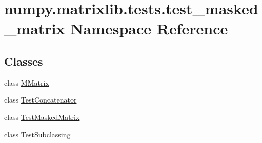 \hypertarget{namespacenumpy_1_1matrixlib_1_1tests_1_1test__masked__matrix}{}\section{numpy.\+matrixlib.\+tests.\+test\+\_\+masked\+\_\+matrix Namespace Reference}
\label{namespacenumpy_1_1matrixlib_1_1tests_1_1test__masked__matrix}
\subsection*{Classes}
\begin{DoxyCompactItemize}
\item 
class \hyperlink{classnumpy_1_1matrixlib_1_1tests_1_1test__masked__matrix_1_1MMatrix}{M\+Matrix}
\item 
class \hyperlink{classnumpy_1_1matrixlib_1_1tests_1_1test__masked__matrix_1_1TestConcatenator}{Test\+Concatenator}
\item 
class \hyperlink{classnumpy_1_1matrixlib_1_1tests_1_1test__masked__matrix_1_1TestMaskedMatrix}{Test\+Masked\+Matrix}
\item 
class \hyperlink{classnumpy_1_1matrixlib_1_1tests_1_1test__masked__matrix_1_1TestSubclassing}{Test\+Subclassing}
\end{DoxyCompactItemize}
